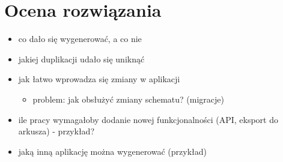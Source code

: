 \chapter{Ocena rozwiązania} \label{chap:evaluation}

\begin{itemize}
 \item co dało się wygenerować, a co nie
 \item jakiej duplikacji udało się uniknąć
 \item jak łatwo wprowadza się zmiany w aplikacji
  \begin{itemize}
   \item problem: jak obsłużyć zmiany schematu? (migracje)
  \end{itemize}
 \item ile pracy wymagałoby dodanie nowej funkcjonalności (API, eksport do arkusza) - przykład?
 \item jaką inną aplikację można wygenerować (przykład)
\end{itemize}